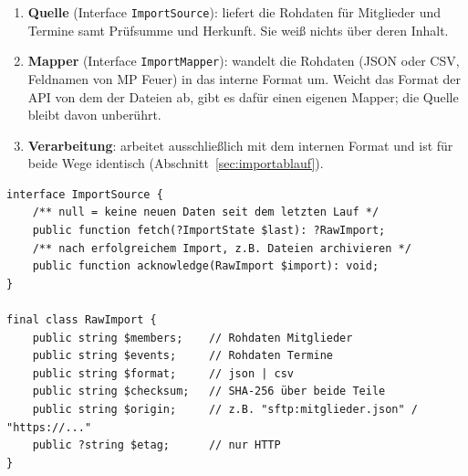 \documentclass[a4paper,fontsize=10pt]{scrartcl}
\newcommand{\code}[1]{\texttt{#1}}
\begin{document}
\begin{center}
\end{center}

\begin{enumerate}
  \item \textbf{Quelle} (Interface \code{ImportSource}): liefert die
        Rohdaten für Mitglieder und Termine samt Prüfsumme und Herkunft.
        Sie weiß nichts über deren Inhalt.
  \item \textbf{Mapper} (Interface \code{ImportMapper}): wandelt die
        Rohdaten (JSON oder CSV, Feldnamen von MP Feuer) in das interne
        Format um. Weicht das Format der API von dem der Dateien ab, gibt es
        dafür einen eigenen Mapper; die Quelle bleibt davon unberührt.
  \item \textbf{Verarbeitung}: arbeitet ausschließlich mit dem internen
        Format und ist für beide Wege identisch (Abschnitt~\ref{sec:importablauf}).
\end{enumerate}

\begin{lstlisting}
interface ImportSource {
    /** null = keine neuen Daten seit dem letzten Lauf */
    public function fetch(?ImportState $last): ?RawImport;
    /** nach erfolgreichem Import, z.B. Dateien archivieren */
    public function acknowledge(RawImport $import): void;
}

final class RawImport {
    public string $members;    // Rohdaten Mitglieder
    public string $events;     // Rohdaten Termine
    public string $format;     // json | csv
    public string $checksum;   // SHA-256 über beide Teile
    public string $origin;     // z.B. "sftp:mitglieder.json" / "https://..."
    public ?string $etag;      // nur HTTP
}
\end{lstlisting}
\end{document}
